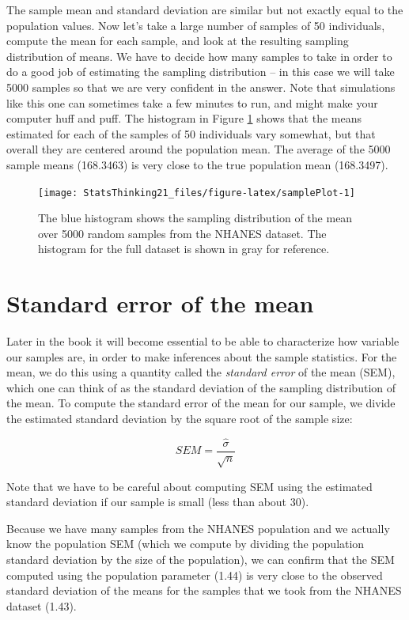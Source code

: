 \documentclass[
  12pt,
]{book}
\begin{document}
The sample mean and standard deviation are similar but not exactly equal to the population values. Now let's take a large number of samples of 50 individuals, compute the mean for each sample, and look at the resulting sampling distribution of means. We have to decide how many samples to take in order to do a good job of estimating the sampling distribution -- in this case we will take 5000 samples so that we are very confident in the answer. Note that simulations like this one can sometimes take a few minutes to run, and might make your computer huff and puff. The histogram in Figure \ref{fig:samplePlot} shows that the means estimated for each of the samples of 50 individuals vary somewhat, but that overall they are centered around the population mean. The average of the 5000 sample means (168.3463) is very close to the true population mean (168.3497).

\begin{figure}
\texttt{[image: StatsThinking21\_files/figure-latex/samplePlot-1]} \caption{The blue histogram shows the sampling distribution of the mean over 5000 random samples from the NHANES dataset.  The histogram for the full dataset is shown in gray for reference.}\label{fig:samplePlot}
\end{figure}

\hypertarget{standard-error-of-the-mean}{%
\section{Standard error of the mean}\label{standard-error-of-the-mean}}

Later in the book it will become essential to be able to characterize how variable our samples are, in order to make inferences about the sample statistics. For the mean, we do this using a quantity called the \emph{standard error} of the mean (SEM), which one can think of as the standard deviation of the sampling distribution of the mean. To compute the standard error of the mean for our sample, we divide the estimated standard deviation by the square root of the sample size:

\[
SEM = \frac{\hat{\sigma}}{\sqrt{n}}
\]

Note that we have to be careful about computing SEM using the estimated standard deviation if our sample is small (less than about 30).

Because we have many samples from the NHANES population and we actually know the population SEM (which we compute by dividing the population standard deviation by the size of the population), we can confirm that the SEM computed using the population parameter (1.44) is very close to the observed standard deviation of the means for the samples that we took from the NHANES dataset (1.43).
\end{document}

